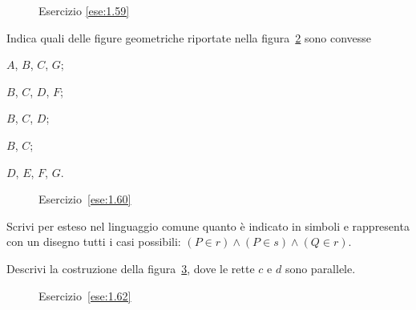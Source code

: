 \begin{inaccessibleblock}
 \begin{figure}[htb]
 \centering
 \caption{Esercizio \ref{ese:1.59}}\label{fig:ese1.59}
\end{figure}
\end{inaccessibleblock}

\begin{esercizio}
\label{ese:1.60}
Indica quali delle figure geometriche riportate nella 
figura~\ref{fig:ese1.60} sono convesse
\begin{multicols}{5}
\begin{enumeratea}
\item $A$, $B$, $C$, $G$;
\item $B$, $C$, $D$, $F$;
\item $B$, $C$, $D$;
\item $B$, $C$;
\item $D$, $E$, $F$, $G$.
\end{enumeratea}
\end{multicols}
\end{esercizio}


\begin{inaccessibleblock}
 \begin{figure}[htb]
 \centering
 \caption{Esercizio~\ref{ese:1.60}}\label{fig:ese1.60}
\end{figure}
\end{inaccessibleblock}

\begin{esercizio}
\label{ese:1.61}
Scrivi per esteso nel linguaggio comune quanto è indicato in simboli 
e rappresenta con un disegno tutti i casi possibili: $(P\in r)\wedge 
(P\in s)\wedge (Q\in r)$.
\end{esercizio}

\begin{esercizio}
\label{ese:1.62}
Descrivi la costruzione della figura~\ref{fig:ese1.62}, dove le rette 
$c$ e $d$ sono parallele.
\end{esercizio}


\begin{inaccessibleblock}
 \begin{figure}[htb]
 \centering
 \caption{Esercizio~\ref{ese:1.62}}\label{fig:ese1.62}
\end{figure}
\end{inaccessibleblock}
 
